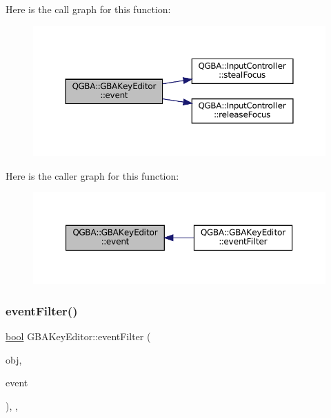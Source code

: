 Here is the call graph for this function\+:
\nopagebreak
\begin{figure}[H]
\begin{center}
\leavevmode
\includegraphics[width=350pt]{class_q_g_b_a_1_1_g_b_a_key_editor_a5e0ea82cb3b9547511dff167b10922a1_cgraph}
\end{center}
\end{figure}
Here is the caller graph for this function\+:
\nopagebreak
\begin{figure}[H]
\begin{center}
\leavevmode
\includegraphics[width=350pt]{class_q_g_b_a_1_1_g_b_a_key_editor_a5e0ea82cb3b9547511dff167b10922a1_icgraph}
\end{center}
\end{figure}
\mbox{\label{class_q_g_b_a_1_1_g_b_a_key_editor_abc261b8e612c62279272378c2ddf58e6}} 
\subsubsection{\texorpdfstring{event\+Filter()}{eventFilter()}}
{\footnotesize\ttfamily \mbox{\hyperlink{libretro_8h_a4a26dcae73fb7e1528214a068aca317e}{bool}} G\+B\+A\+Key\+Editor\+::event\+Filter (\begin{DoxyParamCaption}\item[{Q\+Object $\ast$}]{obj,  }\item[{Q\+Event $\ast$}]{event }\end{DoxyParamCaption})\hspace{0.3cm}{\ttfamily [override]}, {\ttfamily [protected]}, {\ttfamily [virtual]}}


